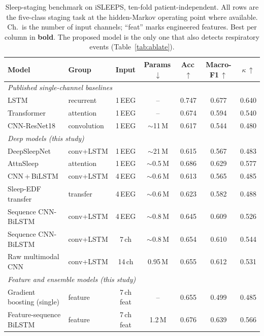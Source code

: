 \documentclass[journal]{IEEEtran}
\begin{document}
\begin{table}[t]
\caption{Sleep-staging benchmark on iSLEEPS, ten-fold patient-independent. All rows are the
five-class staging task at the hidden-Markov operating point where available. Ch.\ is the
number of input channels; ``feat'' marks engineered features. Best per column in
\textbf{bold}. The proposed model is the only one that also detects respiratory events
(Table~\ref{tab:ablate}).}
\label{tab:bench}
\centering
\setlength{\tabcolsep}{6pt}
\begin{tabular}{llccccc}
\toprule
Model & Group & Input & Params\,$\downarrow$ & Acc\,$\uparrow$ & Macro-F1\,$\uparrow$ & $\kappa$\,$\uparrow$ \\
\midrule
\multicolumn{7}{l}{\emph{Published single-channel baselines}~\cite{maiti2026isleeps}}\\
LSTM                       & recurrent   & 1\,EEG    & --      & 0.747 & 0.677 & 0.640 \\
Transformer                & attention   & 1\,EEG    & --      & 0.674 & 0.594 & 0.540 \\
CNN-ResNet18               & convolution & 1\,EEG    & $\sim$11\,M & 0.617 & 0.544 & 0.480 \\
\midrule
\multicolumn{7}{l}{\emph{Deep models (this study)}}\\
DeepSleepNet~\cite{supratak2017deepsleepnet} & conv+LSTM & 1\,EEG & $\sim$21\,M & 0.615 & 0.567 & 0.483 \\
AttnSleep~\cite{eldele2021attnsleep}         & attention & 1\,EEG & $\sim$0.5\,M & 0.686 & 0.629 & 0.577 \\
CNN\,+\,BiLSTM             & conv+LSTM   & 4\,EEG    & $\sim$0.6\,M & 0.613 & 0.565 & 0.485 \\
Sleep-EDF transfer         & transfer    & 4\,EEG    & $\sim$0.6\,M & 0.623 & 0.582 & 0.488 \\
Sequence CNN-BiLSTM        & conv+LSTM   & 4\,EEG    & $\sim$0.8\,M & 0.645 & 0.609 & 0.526 \\
Sequence CNN-BiLSTM        & conv+LSTM   & 7\,ch     & $\sim$0.8\,M & 0.654 & 0.610 & 0.544 \\
Raw multimodal CNN         & conv+LSTM   & 14\,ch    & 0.95\,M & 0.655 & 0.612 & 0.531 \\
\midrule
\multicolumn{7}{l}{\emph{Feature and ensemble models (this study)}}\\
Gradient boosting (single) & feature     & 7\,ch feat & --     & 0.655 & 0.499 & 0.485 \\
Feature-sequence BiLSTM    & feature     & 7\,ch feat & 1.2\,M & 0.676 & 0.639 & 0.566 \\

\end{tabular}
\end{table}
\end{document}
